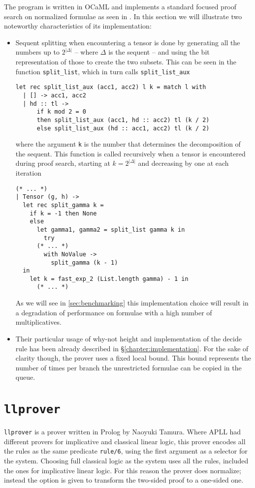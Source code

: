 The program is written in OCaML and implements a standard focused proof search on normalized formulae as seen in \cite{LiangMiller}.
In this section we will illustrate two noteworthy characteristics of its implementation:
\begin{itemize}
	\item Sequent splitting when encountering a tensor is done by generating all the numbers up to $2^{|\Delta|}$ -- where $\Delta$ is the sequent -- and using the bit representation of those to create the two subsets.
		This can be seen in the function \texttt{split\_list}, which in turn calls \texttt{split\_list\_aux}
		\begin{verbatim}
let rec split_list_aux (acc1, acc2) l k = match l with
  | [] -> acc1, acc2
  | hd :: tl -> 
      if k mod 2 = 0 
      then split_list_aux (acc1, hd :: acc2) tl (k / 2)
      else split_list_aux (hd :: acc1, acc2) tl (k / 2)
		\end{verbatim}
		where the argument \texttt{k} is the number that determines the decomposition of the sequent.
		This function is called recursively when a tensor is encountered during proof search, starting at $ k = 2^{|\Delta|}$ and decreasing by one at each iteration
		\begin{verbatim}
(* ... *)
| Tensor (g, h) ->
  let rec split_gamma k = 
    if k = -1 then None
    else
      let gamma1, gamma2 = split_list gamma k in
        try
	  (* ... *)
        with NoValue ->
          split_gamma (k - 1) 
  in
    let k = fast_exp_2 (List.length gamma) - 1 in
      (* ... *)
		\end{verbatim}

		As we will see in \ref{sec:benchmarking} this implementation choice will result in a degradation of performance on formulae with a high number of multiplicatives.
	\item Their particular usage of why-not height and implementation of the decide rule has been already described in \S\ref{chapter:implementation}.
		For the sake of clarity though, the prover uses a fixed local bound.
		This bound represents the number of times per branch the unrestricted formulae can be copied in the queue.
\end{itemize}

\section{\texttt{llprover}}
\texttt{llprover} is a prover written in Prolog by Naoyuki Tamura.
Where APLL had different provers for implicative and classical linear logic, this prover encodes all the rules as the same predicate \texttt{rule/6}, using the first argument as a selector for the system.
Choosing full classical logic as the system uses all the rules, included the ones for implicative linear logic.
For this reason the prover does normalize; instead the option is given to transform the two-sided proof to a one-sided one.

